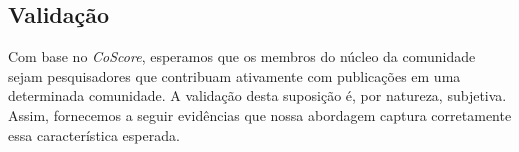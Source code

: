 \subsection{Validação}

Com base no \textit{CoScore}, esperamos que os membros do núcleo da comunidade sejam pesquisadores que contribuam ativamente com publicações em uma determinada comunidade.
A validação desta suposição é, por natureza, subjetiva. Assim, fornecemos a seguir evidências que nossa abordagem captura corretamente essa característica esperada.

